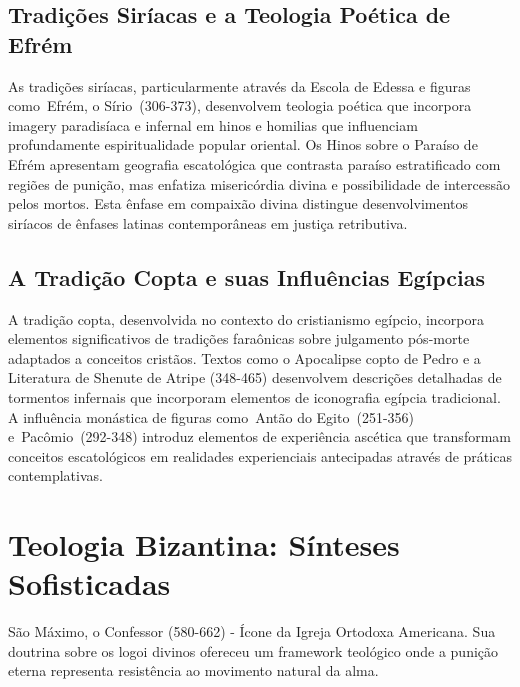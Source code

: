 \subsection{Tradições Siríacas e a Teologia Poética de Efrém}



As tradições siríacas, particularmente através da Escola de Edessa e figuras como Efrém, o Sírio (306-373), desenvolvem teologia poética que incorpora imagery paradisíaca e infernal em hinos e homilias que influenciam profundamente espiritualidade popular oriental. Os Hinos sobre o Paraíso de Efrém apresentam geografia escatológica que contrasta paraíso estratificado com regiões de punição, mas enfatiza misericórdia divina e possibilidade de intercessão pelos mortos. Esta ênfase em compaixão divina distingue desenvolvimentos siríacos de ênfases latinas contemporâneas em justiça retributiva.

\subsection{A Tradição Copta e suas Influências Egípcias}


A tradição copta, desenvolvida no contexto do cristianismo egípcio, incorpora elementos significativos de tradições faraônicas sobre julgamento pós-morte adaptados a conceitos cristãos. Textos como o Apocalipse copto de Pedro e a Literatura de Shenute de Atripe (348-465) desenvolvem descrições detalhadas de tormentos infernais que incorporam elementos de iconografia egípcia tradicional. A influência monástica de figuras como Antão do Egito (251-356) e Pacômio (292-348) introduz elementos de experiência ascética que transformam conceitos escatológicos em realidades experienciais antecipadas através de práticas contemplativas.


\section{Teologia Bizantina: Sínteses Sofisticadas}




São Máximo, o Confessor (580-662) - Ícone da Igreja Ortodoxa Americana. Sua doutrina sobre os logoi divinos ofereceu um framework teológico onde a punição eterna representa resistência ao movimento natural da alma.

